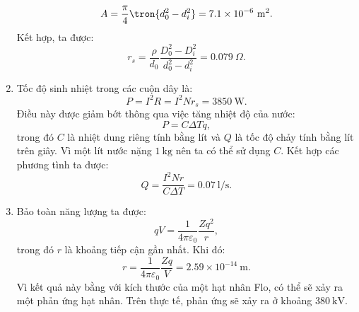\begin{loigiai}
\begin{enumerate}[1)]
    $$A=\dfrac{\pi}{4}\tron{d_0^2-d_i^2}=7.1\times10^{-6}~\mathrm{m^2}.$$
    Kết hợp, ta được:
    $$r_s=\dfrac{\rho}{d_0}\dfrac{D_0^2-D_i^2}{d_0^2-d_i^2}=0.079~\Omega.$$
    \item Tốc độ sinh nhiệt trong các cuộn dây là:
    $$P=I^2R=I^2Nr_s=3850~\mathrm{W}.$$
    Điều này được giảm bớt thông qua việc tăng nhiệt độ của nước:
    $$P=C\Delta Tq,$$
    trong đó $C$ là nhiệt dung riêng tính bằng lít và $Q$ là tốc độ chảy tính bằng lít trên giây. Vì một lít nước nặng $1~\mathrm{kg}$ nên ta có thể sử dụng $C$. Kết hợp các phương tình ta được:
    $$Q=\dfrac{I^2Nr}{C\Delta T}=0.07~\mathrm{l/s}.$$
    \item Bảo toàn năng lượng ta được:
    $$qV=\dfrac{1}{4\pi\varepsilon_0}\dfrac{Zq^2}{r},$$
    trong đó $r$ là khoảng tiếp cận gần nhất. Khi đó:
    $$r=\dfrac{1}{4\pi\varepsilon_0}\dfrac{Zq}{V}=2.59\times 10^{-14}~\mathrm{m}.$$
    Vì kết quả này bằng với kích thước của một hạt nhân Flo, có thể sẽ xảy ra một phản ứng hạt nhân. Trên thực tế, phản ứng sẽ xảy ra ở khoảng $380~\mathrm{kV}$.
    
\end{enumerate}
\end{loigiai}


